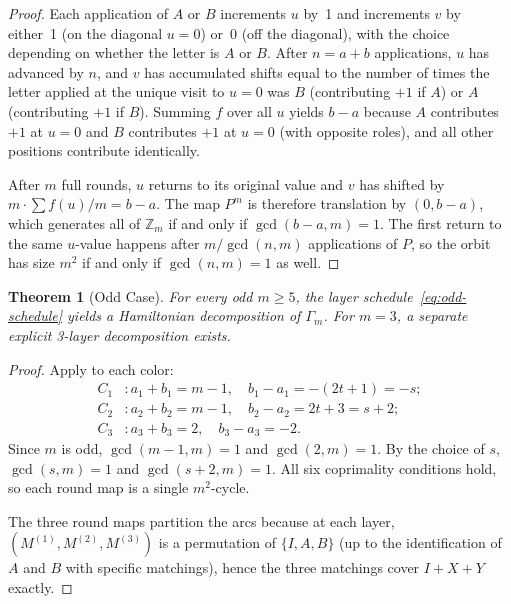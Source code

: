 \documentclass[11pt]{article}
\newtheorem{theorem}{Theorem}[section]
\theoremstyle{definition}
\theoremstyle{remark}
\newcommand{\Zm}{\mathbb{Z}_m}
\begin{document}
\begin{proof}
Each application of $A$ or $B$ increments $u$ by~1 and increments $v$ by either~1 (on the diagonal $u = 0$) or~0 (off the diagonal), with the choice depending on whether the letter is $A$ or $B$. After $n = a + b$ applications, $u$ has advanced by $n$, and $v$ has accumulated shifts equal to the number of times the letter applied at the unique visit to $u = 0$ was $B$ (contributing $+1$ if $A$) or $A$ (contributing $+1$ if $B$). Summing $f$ over all $u$ yields $b - a$ because $A$ contributes $+1$ at $u = 0$ and $B$ contributes $+1$ at $u = 0$ (with opposite roles), and all other positions contribute identically.

After $m$ full rounds, $u$ returns to its original value and $v$ has shifted by $m \cdot \sum f(u) / m = b - a$. The map $P^m$ is therefore translation by $(0, b-a)$, which generates all of $\Zm$ if and only if $\gcd(b-a, m) = 1$. The first return to the same $u$-value happens after $m / \gcd(n, m)$ applications of $P$, so the orbit has size $m^2$ if and only if $\gcd(n, m) = 1$ as well.
\end{proof}

\begin{theorem}[Odd Case]
\label{thm:odd}
For every odd $m \geq 5$, the layer schedule~\eqref{eq:odd-schedule} yields a Hamiltonian decomposition of $\Gamma_m$. For $m = 3$, a separate explicit 3-layer decomposition exists.
\end{theorem}

\begin{proof}
Apply  to each color:
\begin{align}
    C_1 &: a_1 + b_1 = m - 1, \quad b_1 - a_1 = -(2t+1) = -s; \\
    C_2 &: a_2 + b_2 = m - 1, \quad b_2 - a_2 = 2t + 3 = s + 2; \\
    C_3 &: a_3 + b_3 = 2, \quad b_3 - a_3 = -2.
\end{align}
Since $m$ is odd, $\gcd(m-1, m) = 1$ and $\gcd(2, m) = 1$. By the choice of $s$, $\gcd(s, m) = 1$ and $\gcd(s+2, m) = 1$. All six coprimality conditions hold, so each round map is a single $m^2$-cycle.

The three round maps partition the arcs because at each layer, $(M^{(1)}, M^{(2)}, M^{(3)})$ is a permutation of $\{I, A, B\}$ (up to the identification of $A$ and $B$ with specific matchings), hence the three matchings cover $I + X + Y$ exactly.
\end{proof}
\end{document}
